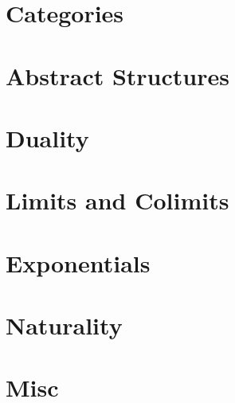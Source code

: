 \documentclass{article}
\theoremstyle{definition}
\theoremstyle{remark}
\begin{document}
\section{Categories}


\section{Abstract Structures}



\section{Duality}




\section{Limits and Colimits}




\section{Exponentials}



\section{Naturality}




\section{Misc}

\end{document}
